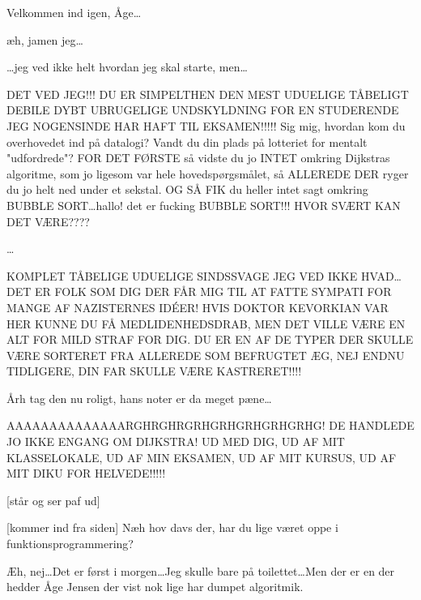 \documentclass[a4paper,11pt]{article}
\begin{document}
\begin{sketch}

   Velkommen ind igen, Åge\ldots

   æh, jamen jeg\ldots

   \ldots jeg ved ikke helt hvordan jeg skal starte, men\ldots

   DET VED JEG!!! DU ER SIMPELTHEN DEN MEST UDUELIGE TÅBELIGT DEBILE DYBT
  UBRUGELIGE UNDSKYLDNING FOR EN STUDERENDE JEG NOGENSINDE HAR HAFT TIL
  EKSAMEN!!!!! Sig mig, hvordan kom du overhovedet ind på datalogi? Vandt du din
  plads på lotteriet for mentalt "udfordrede"? FOR DET FØRSTE så vidste du jo
  INTET omkring Dijkstras algoritme, som jo ligesom var hele hovedspørgsmålet, så
  ALLEREDE DER ryger du jo helt ned under et sekstal. OG SÅ FIK du heller intet
  sagt omkring BUBBLE SORT\ldots hallo! det er fucking BUBBLE SORT!!! HVOR SVÆRT
  KAN DET VÆRE????

   \ldots {}

   KOMPLET TÅBELIGE UDUELIGE SINDSSVAGE JEG VED IKKE HVAD\ldots DET ER
  FOLK SOM DIG DER FÅR MIG TIL AT FATTE SYMPATI FOR MANGE AF NAZISTERNES IDÉER!
  HVIS DOKTOR KEVORKIAN VAR HER KUNNE DU FÅ MEDLIDENHEDSDRAB, MEN DET VILLE VÆRE
  EN ALT FOR MILD STRAF FOR DIG. DU ER EN AF DE TYPER DER SKULLE VÆRE SORTERET
  FRA ALLEREDE SOM BEFRUGTET ÆG, NEJ ENDNU TIDLIGERE, DIN FAR SKULLE VÆRE
  KASTRERET!!!!

   Årh tag den nu roligt, hans noter er da meget pæne\ldots

   AAAAAAAAAAAAAARGHRGHRGRHGRHGRHGRHGRHG!  DE HANDLEDE JO IKKE ENGANG OM
  DIJKSTRA! UD MED DIG, UD AF MIT KLASSELOKALE, UD AF MIN EKSAMEN, UD AF MIT
  KURSUS, UD AF MIT DIKU FOR HELVEDE!!!!!


  [står og ser paf ud]

  [kommer ind fra siden] Næh hov davs der, har du lige været oppe i
  funktionsprogrammering?

   Æh, nej\ldots Det er først i morgen\ldots Jeg skulle bare på
  toilettet\ldots Men der er en der hedder Åge Jensen der vist nok lige har
  dumpet algoritmik.


\end{sketch}
\end{document}
